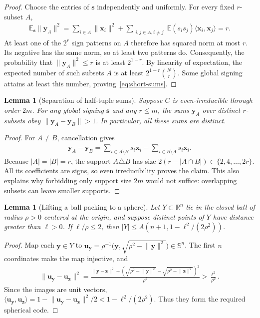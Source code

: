 \documentclass[pdflatex,sn-mathphys-num]{sn-jnl}
\theoremstyle{thmstyleone}
\newtheorem{lemma}[theorem]{Lemma}
\theoremstyle{thmstyletwo}
\newcommand{\vx}{\mathbf{x}}
\newcommand{\vy}{\mathbf{y}}
\newcommand{\vz}{\mathbf{z}}
\newcommand{\vu}{\mathbf{u}}
\newcommand{\vs}{\mathbf{s}}
\newcommand{\sph}{\mathbb S}
\newcommand{\RR}{\mathbb R}
\newcommand{\EE}{\mathbb E}
\newcommand{\norm}[1]{\lVert#1\rVert}
\begin{document}
\begin{proof}
Choose the entries of $\vs$ independently and uniformly. For every fixed $r$-subset $A$,
\begin{align}
 \EE_{\vs}\norm{\vy_A}^2
 =\sum_{i\in A}\norm{\vx_i}^2+
   \sum_{\substack{i,j\in A, i \neq j}}
   \EE(s_i s_j)\langle\vx_i,\vx_j\rangle=r.
\end{align}
At least one of the $2^r$ sign patterns on $A$ therefore has squared norm at most $r$. Its negative has the same norm, so at least two patterns do. Consequently, the probability that $\norm{\vy_A}^2\le r$ is at least $2^{1-r}$. By linearity of expectation, the expected number of such subsets $A$ is at least $2^{1-r}\binom Nr$. Some global signing attains at least this number, proving~\eqref{eq:short-sums}.
\end{proof}

\begin{lemma}[Separation of half-tuple sums]
\label{lem:separation}
Suppose $C$ is even-irreducible through order $2m$. For any global signing $\vs$ and any $r\le m$, the sums $\vy_A$ over distinct $r$-subsets obey $\norm{\vy_A-\vy_B}>1$. In particular, all these sums are distinct.
\end{lemma}

\begin{proof}
For $A\ne B$, cancellation gives
\begin{align}
\vy_A-\vy_B=\sum_{i\in A\setminus B}s_i \vx_i-\sum_{i\in B\setminus A}s_i \vx_i.
\end{align}
Because $|A|=|B|=r$, the support $A\triangle B$ has size $2(r-|A\cap B|)\in\{2,4,\ldots,2r\}$. All its coefficients are signs, so even irreducibility proves the claim. This also explains why forbidding only support size $2m$ would not suffice: overlapping subsets can leave smaller supports.
\end{proof}

\begin{lemma}[Lifting a ball packing to a sphere]
\label{lem:lift}
Let $Y\subset\RR^n$ lie in the closed ball of radius $\rho>0$ centered at the origin, and suppose distinct points of $Y$ have distance greater than $\ell>0$. If $\ell/\rho\le2$, then $|Y|\le A(n+1,1-\ell^2/(2\rho^2))$.
\end{lemma}

\begin{proof}
Map each $\vy\in Y$ to $\vu_{\vy}=\rho^{-1}\bigl(\vy,\sqrt{\rho^2-\norm{\vy}^2}\bigr)\in\sph^n$. The first $n$ coordinates make the map injective, and
\begin{align}
 \norm{\vu_{\vy}-\vu_{\vz}}^2
 =\frac{\norm{\vy-\vz}^2+(\sqrt{\rho^2-\norm{\vy}^2}-\sqrt{\rho^2-\norm{\vz}^2})^2}{\rho^2}
 >\frac{\ell^2}{\rho^2}.
\end{align}
Since the images are unit vectors, $\langle\vu_{\vy},\vu_{\vz}\rangle=1-\norm{\vu_{\vy}-\vu_{\vz}}^2/2 <1-\ell^2/(2\rho^2)$. Thus they form the required spherical code.
\end{proof}
\end{document}
